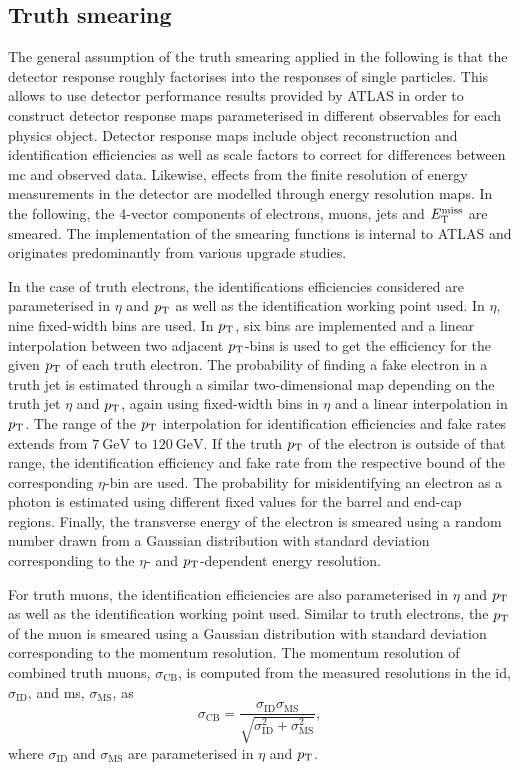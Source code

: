 \subsection{Truth smearing}\label{sec:truth_smearing}

The general assumption of the truth smearing applied in the following is that the detector response roughly factorises into the responses of single particles. This allows to use detector performance results provided by ATLAS in order to construct detector response maps parameterised in different observables for each physics object. Detector response maps include object reconstruction and identification efficiencies as well as scale factors to correct for differences between \gls{mc} and observed data. Likewise, effects from the finite resolution of energy measurements in the detector are modelled through energy resolution maps. In the following, the 4-vector components of electrons, muons, jets and $E_{\textrm{T}}^{\textrm{miss}}$ are smeared. The implementation of the smearing functions is internal to ATLAS and originates predominantly from various upgrade studies.

In the case of truth electrons, the identifications efficiencies considered are parameterised in $\eta$ and $p_{\textrm{T}}$ as well as the identification working point used. In $\eta$, nine fixed-width bins are used. In $p_{\textrm{T}}$, six bins are implemented and a linear interpolation between two adjacent $p_{\textrm{T}}$-bins is used to get the efficiency for the given $p_{\textrm{T}}$ of each truth electron. The probability of finding a fake electron in a truth jet is estimated through a similar two-dimensional map depending on the truth jet $\eta$ and $p_{\textrm{T}}$, again using fixed-width bins in $\eta$ and a linear interpolation in $p_{\textrm{T}}$. The range of the $p_{\textrm{T}}$ interpolation for identification efficiencies and fake rates extends from $\SI{7}{\GeV}$ to $\SI{120}{\GeV}$. If the truth $p_{\textrm{T}}$ of the electron is outside of that range, the identification efficiency and fake rate from the respective bound of the corresponding $\eta$-bin are used. The probability for misidentifying an electron as a photon is estimated using different fixed values for the barrel and end-cap regions. Finally, the transverse energy of the electron is smeared using a random number drawn from a Gaussian distribution with  standard deviation corresponding to the $\eta$- and $p_{\textrm{T}}$-dependent energy resolution.  

For truth muons, the identification efficiencies are also parameterised in $\eta$ and $p_{\textrm{T}}$ as well as the identification working point used. Similar to truth electrons, the  $p_{\textrm{T}}$ of the muon is smeared using a Gaussian distribution with standard deviation corresponding to the momentum resolution. The momentum resolution of combined truth muons, $\sigma_\mathrm{CB}$, is computed from the measured resolutions in the \gls{id},$\sigma_\mathrm{ID}$, and \gls{ms}, $\sigma_\mathrm{MS}$, as
\begin{equation}
	\sigma_\mathrm{CB} = \frac{\sigma_\mathrm{ID}\sigma_\mathrm{MS}}{\sqrt{\sigma_\mathrm{ID}^2 + \sigma_\mathrm{MS}^2}},
\end{equation}
where $\sigma_\mathrm{ID}$ and $\sigma_\mathrm{MS}$ are parameterised in $\eta$ and $p_{\textrm{T}}$.

